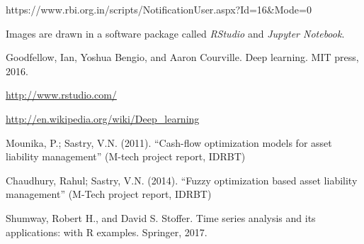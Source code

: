 \begin{thebibliography}{1}
		  https://www.rbi.org.in/scripts/NotificationUser.aspx?Id=16\&Mode=0
		 
		 Images are drawn in a software package called \emph{RStudio} and \emph{Jupyter Notebook}.		 
		 
		 Goodfellow, Ian, Yoshua Bengio, and Aaron Courville. Deep learning. MIT press, 2016.
		 
		 \url{http://www.rstudio.com/}		 
		 
		 \url{http://en.wikipedia.org/wiki/Deep\_learning}		 
		 
		 Mounika, P.; Sastry, V.N. (2011). “Cash-flow optimization models for asset liability management” (M-tech project report, IDRBT) 

		 
		 Chaudhury, Rahul; Sastry, V.N. (2014). “Fuzzy optimization based asset liability management” (M-Tech project report, IDRBT) 

		 
		 Shumway, Robert H., and David S. Stoffer. Time series analysis and its applications: with R examples. Springer, 2017.	
		 

		 

		 

		 

		
\end{thebibliography}
